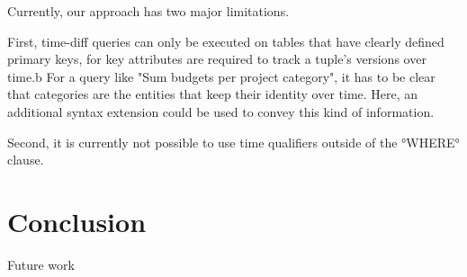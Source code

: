 \documentclass[english]{sig-alternate-05-2015}
\begin{document}
Currently, our approach has two major limitations.

First, time-diff queries can only be executed on tables that have clearly defined primary keys, for key attributes are required to track a tuple's versions over time.b
For a query like "Sum budgets per project category", it has to be clear that categories are the entities that keep their identity over time.
Here, an additional syntax extension could be used to convey this kind of information.

Second, it is currently not possible to use time qualifiers outside of the °WHERE° clause.


\section{Conclusion}



Future work

%

\end{document}
